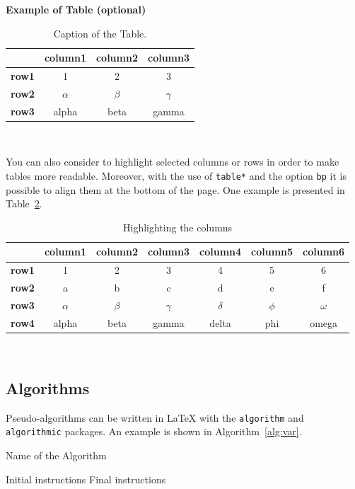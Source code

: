 \documentclass[11pt,a4paper]{article}
\begin{document}
\begin{table}[H]
    \caption*{\textbf{Example of Table (optional)}}
    \centering 
    \begin{tabular}{|p{3em} c c c |}
    \hline
    \rowcolor{bluePoli!40}
     & \textbf{column1} & \textbf{column2} & \textbf{column3} \T\B \\
    \hline \hline
    \textbf{row1} & 1 & 2 & 3 \T\B \\
    \textbf{row2} & $\alpha$ & $\beta$ & $\gamma$ \T\B\\
    \textbf{row3} & alpha & beta & gamma \B\\
    \hline
    \end{tabular}
    \\[10pt]
    \caption{Caption of the Table.}
    \label{table:example}
\end{table}

You can also consider to highlight selected columns or rows in order to make tables more readable.
Moreover, with the use of \texttt{table*} and the option \texttt{bp} it is possible to align them at the bottom of the page. One example is presented in Table~\ref{table:exampleC}. 

\begin{table}[bp]
\centering 
    \begin{tabular}{|p{3em} | c | c | c | c | c | c|}
    \hline
     & \textbf{column1} & \textbf{column2} & \textbf{column3} & \textbf{column4} & \textbf{column5} & \textbf{column6} \T\B \\
    \hline \hline
    \textbf{row1} & 1 & 2 & 3 & 4 & 5 & 6 \T\B\\
    \textbf{row2} & a & b & c & d & e & f \T\B\\
    \textbf{row3} & $\alpha$ & $\beta$ & $\gamma$ & $\delta$ & $\phi$ & $\omega$ \T\B\\
    \textbf{row4} & alpha & beta & gamma & delta & phi & omega \B\\
    \hline
    \end{tabular}
    \\[10pt]
    \caption{Highlighting the columns}
    \label{table:exampleC}
\end{table}

\subsection{Algorithms}
\label{subsec:algorithms}

Pseudo-algorithms can be written in \LaTeX{} with the \texttt{algorithm} and \texttt{algorithmic} packages.
An example is shown in Algorithm~\ref{alg:var}.
\begin{algorithm}[H]
\label{alg:example}
\caption{Name of the Algorithm}
\label{alg:var}
\label{protocol1}
\begin{algorithmic}[1]
\STATE Initial instructions
\ENDIF
\ENDFOR
{}
\ENDWHILE
\STATE Final instructions
\end{algorithmic}
\end{algorithm} 
\end{document}
